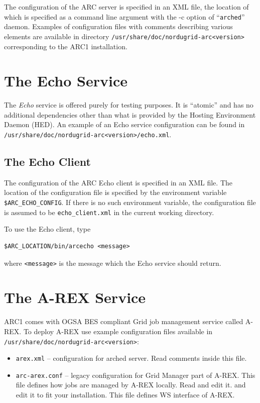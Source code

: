 \documentclass{article}                            %
\begin{document}
The configuration of the ARC server is specified in an XML file, the location of
which is specified as a command line argument with the -c option of
``\texttt{arched}'' daemon. Examples of configuration files with comments
describing various elements are available in directory
\texttt{/usr/share/doc/nordugrid-arc<version>} corresponding to the ARC1
installation.


\section{The Echo Service}
\label{sec:echo-service}

The \textit{Echo} service is offered purely for testing purposes. It is
``atomic'' and has no additional dependencies other than what is provided by the
Hosting Environment Daemon (HED). An example of an Echo service configuration
can be found in \texttt{/usr/share/doc/nordugrid-arc<version>/echo.xml}.


\subsection{The Echo Client}
\label{sec:echo-client}

The configuration of the ARC Echo client is specified in an XML
file. The location of the configuration file is specified by the
environment variable \verb|$ARC_ECHO_CONFIG|. If there is no such
environment
variable, the configuration file is assumed to be \verb|echo_client.xml| in
the current working directory.

To use the Echo client, type

\begin{lstlisting}
$ARC_LOCATION/bin/arcecho <message>
\end{lstlisting}

where \verb|<message>| is the message which the Echo service should return.


\section{The A-REX Service}
\label{sec:a-rex}

ARC1 comes with OGSA BES compliant Grid job management service called A-REX.
To deploy A-REX use example configuration files available in
\verb|/usr/share/doc/nordugrid-arc<version>|:

\begin{itemize}
 \item \texttt{arex.xml} -- configuration for arched server. Read comments
inside this file.
 \item \texttt{arc-arex.conf} -- legacy configuration for Grid Manager part of
A-REX. This
file defines how jobs are managed by A-REX locally. Read and edit it.
and edit it to fit your installation. This file defines WS interface of A-REX.
\end{itemize}
\end{document}
